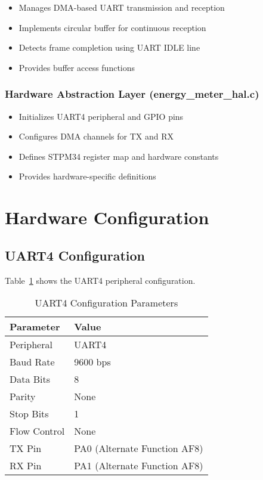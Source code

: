 \documentclass[11pt,a4paper]{article}
\begin{document}
\begin{itemize}[noitemsep]
    \item Manages DMA-based UART transmission and reception
    \item Implements circular buffer for continuous reception
    \item Detects frame completion using UART IDLE line
    \item Provides buffer access functions
\end{itemize}

\subsubsection{Hardware Abstraction Layer (energy\_meter\_hal.c)}

\begin{itemize}[noitemsep]
    \item Initializes UART4 peripheral and GPIO pins
    \item Configures DMA channels for TX and RX
    \item Defines STPM34 register map and hardware constants
    \item Provides hardware-specific definitions
\end{itemize}

\section{Hardware Configuration}

\subsection{UART4 Configuration}

Table~\ref{tab:uart_config} shows the UART4 peripheral configuration.

\begin{table}[H]
\centering
\begin{tabular}{ll}
\toprule
\textbf{Parameter} & \textbf{Value} \\
\midrule
Peripheral & UART4 \\
Baud Rate & 9600 bps \\
Data Bits & 8 \\
Parity & None \\
Stop Bits & 1 \\
Flow Control & None \\
TX Pin & PA0 (Alternate Function AF8) \\
RX Pin & PA1 (Alternate Function AF8) \\
\bottomrule
\end{tabular}
\caption{UART4 Configuration Parameters}
\label{tab:uart_config}
\end{table}
\end{document}
